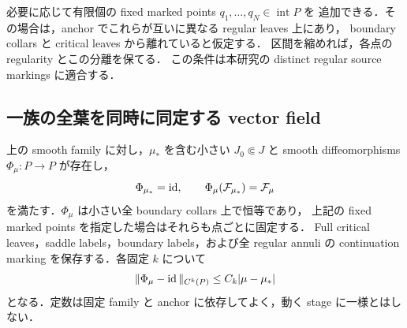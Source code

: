 必要に応じて有限個の fixed marked points $q_1,\ldots,q_N\in\operatorname{int}P$ を
追加できる．その場合は，anchor でこれらが互いに異なる regular leaves 上にあり，
boundary collars と critical leaves から離れていると仮定する．
区間を縮めれば，各点の regularity とこの分離を保てる．
この条件は本研究の distinct regular source markings に適合する．

\subsection{一族の全葉を同時に同定する vector field}

\begin{lemma}
\label{ke:simple-saddle-family-trivialization}
上の smooth family に対し，$\mu_*$ を含む小さい $J_0\Subset J$ と
smooth diffeomorphisms $\Phi_\mu:P\to P$ が存在し，
\[
 \Phi_{\mu_*}=\operatorname{id},\qquad
 \Phi_\mu(\mathcal F_{\mu_*})=\mathcal F_\mu
\]
を満たす．$\Phi_\mu$ は小さい全 boundary collars 上で恒等であり，
上記の fixed marked points を指定した場合はそれらも点ごとに固定する．
Full critical leaves，saddle labels，boundary labels，および全 regular annuli の
continuation marking を保存する．各固定 $k$ について
\[
 \|\Phi_\mu-\operatorname{id}\|_{C^k(P)}\le C_k|\mu-\mu_*|
\]
となる．定数は固定 family と anchor に依存してよく，動く stage に一様とはしない．
\end{lemma}

